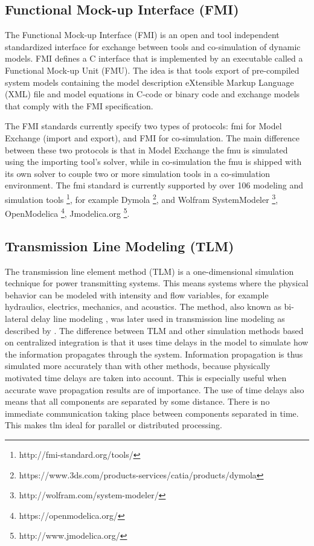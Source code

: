 \subsection{Functional Mock-up Interface (FMI)}
\label{sec:fmi}

The Functional Mock-up Interface (FMI) \cite{fmi,fmiblochwitz} is an open and tool independent standardized interface for exchange between tools and co-simulation of dynamic models. FMI defines a C interface that is implemented by an executable called a Functional Mock-up Unit (FMU). The idea is that tools export of pre-compiled system models containing the model description  eXtensible Markup Language (XML) file and model equations in C-code or binary code and exchange models that comply with the FMI specification. 

The FMI standards currently specify two types of protocols: \acrshort{fmi} for Model Exchange (import and export), and FMI for co-simulation. The main difference between these two protocols is that in Model Exchange the \acrshort{fmu} is simulated using the importing tool's solver, while in co-simulation the \acrshort{fmu} is shipped with its own solver to couple two or more simulation tools in a co-simulation environment. 
The \acrshort{fmi} standard is currently supported by over 106 modeling and simulation tools \footnote{http://fmi-standard.org/tools/}, for example   Dymola \footnote{https://www.3ds.com/products-services/catia/products/dymola}, and Wolfram SystemModeler \footnote{http://wolfram.com/system-modeler/}, OpenModelica \footnote{https://openmodelica.org/}, Jmodelica.org \footnote{http://www.jmodelica.org/}.

\subsection{Transmission Line Modeling (TLM)}
\label{sec:tlm}

The transmission line element method (TLM) \cite{tlmkurs90,tlmkurs99,tlmcogan,tlmjohns} is a one-dimensional simulation technique for power transmitting systems. This means systems where the physical behavior can be modeled with intensity and flow variables, for example hydraulics, electrics, mechanics, and acoustics. The method, also known as bi-lateral delay line modeling \cite{tlmauslander}, was later used in transmission line modeling as described by \cite{tlmjohns}. The difference between TLM and other simulation methods based on centralized integration is that it uses time delays in the model to simulate how the information propagates through the system. Information propagation is thus simulated more accurately than with other methods, because physically motivated time delays are taken into account. This is especially useful when accurate wave propagation results are of importance. The use of time delays also means that all components are separated by some distance. There is no immediate communication taking place between components separated in time. This makes \acrshort{tlm} ideal for parallel or distributed processing.

